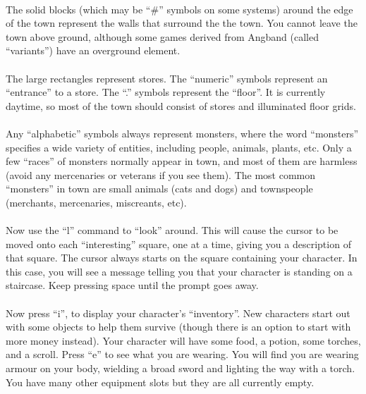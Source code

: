 \paragraph{}The solid blocks (which may be ``\#'' symbols on some systems) around the
edge of the town represent the walls that surround the the town. You
cannot leave the town above ground, although some games derived from
Angband (called ``variants'') have an overground element.

\paragraph{}The large rectangles represent stores. The ``numeric'' symbols represent
an ``entrance'' to a store. The ``.'' symbols represent the ``floor''. It is
currently daytime, so most of the town should consist of stores and
illuminated floor grids.

\paragraph{}Any ``alphabetic'' symbols always represent monsters, where the word
``monsters'' specifies a wide variety of entities, including people,
animals, plants, etc. Only a few ``races'' of monsters normally appear in
town, and most of them are harmless (avoid any mercenaries or veterans
if you see them). The most common ``monsters'' in town are small animals
(cats and dogs) and townspeople (merchants, mercenaries, miscreants,
etc).

\paragraph{}Now use the ``l'' command to ``look'' around. This will cause the cursor to
be moved onto each ``interesting'' square, one at a time, giving you a
description of that square. The cursor always starts on the square
containing your character. In this case, you will see a message telling
you that your character is standing on a staircase. Keep pressing space
until the prompt goes away.

\paragraph{}Now press ``i'', to display your character's ``inventory''. New characters
start out with some objects to help them survive (though there is an
option to start with more money instead). Your character will have some
food, a potion, some torches, and a scroll. Press ``e'' to see what you
are wearing. You will find you are wearing armour on your body,
wielding a broad sword and lighting the way with a torch. You have many
other equipment slots but they are all currently empty.


